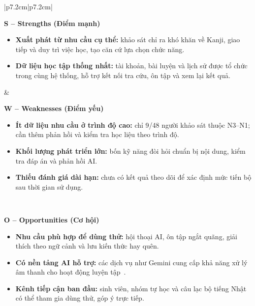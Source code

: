 \begin{table}[htbp]
\centering
\caption{Ma trận SWOT của NihonGO}
\label{tab:swot-matrix}
\begingroup
{}
\fontsize{11}{14}\selectfont
\renewcommand{\arraystretch}{1.1}
\begin{tabular}{|p{7.2cm}|p{7.2cm}|}
\hline
\begin{minipage}[t]{\linewidth}
\raggedright\smallskip
\textbf{S -- Strengths (Điểm mạnh)}
\begin{itemize}[leftmargin=1.2em,itemsep=4pt,parsep=0pt,topsep=5pt]
  \item \textbf{Xuất phát từ nhu cầu cụ thể:} khảo sát chỉ ra khó khăn về Kanji, giao tiếp và duy trì việc học, tạo căn cứ lựa chọn chức năng.
  \item \textbf{Dữ liệu học tập thống nhất:} tài khoản, bài luyện và lịch sử được tổ chức trong cùng hệ thống, hỗ trợ kết nối tra cứu, ôn tập và xem lại kết quả.
\end{itemize}\smallskip
\end{minipage}
&
\begin{minipage}[t]{\linewidth}
\raggedright\smallskip
\textbf{W -- Weaknesses (Điểm yếu)}
\begin{itemize}[leftmargin=1.2em,itemsep=4pt,parsep=0pt,topsep=5pt]
  \item \textbf{Ít dữ liệu nhu cầu ở trình độ cao:} chỉ 9/48 người khảo sát thuộc N3--N1; cần thêm phản hồi và kiểm tra học liệu theo trình độ.
  \item \textbf{Khối lượng phát triển lớn:} bốn kỹ năng đòi hỏi chuẩn bị nội dung, kiểm tra đáp án và phản hồi AI.
  \item \textbf{Thiếu đánh giá dài hạn:} chưa có kết quả theo dõi để xác định mức tiến bộ sau thời gian sử dụng.
\end{itemize}\smallskip
\end{minipage}
\\ \hline
\begin{minipage}[t]{\linewidth}
\raggedright\smallskip
\textbf{O -- Opportunities (Cơ hội)}
\begin{itemize}[leftmargin=1.2em,itemsep=4pt,parsep=0pt,topsep=5pt]
  \item \textbf{Nhu cầu phù hợp để dùng thử:} hội thoại AI, ôn tập ngắt quãng, giải thích theo ngữ cảnh và lưu kiến thức hay quên.
  \item \textbf{Có nền tảng AI hỗ trợ:} các dịch vụ như Gemini cung cấp khả năng xử lý âm thanh cho hoạt động luyện tập~\cite{gemini-audio}.
  \item \textbf{Kênh tiếp cận ban đầu:} sinh viên, nhóm tự học và câu lạc bộ tiếng Nhật có thể tham gia dùng thử, góp ý trực tiếp.

\end{itemize}
\end{minipage}
\end{tabular}
\end{table}
